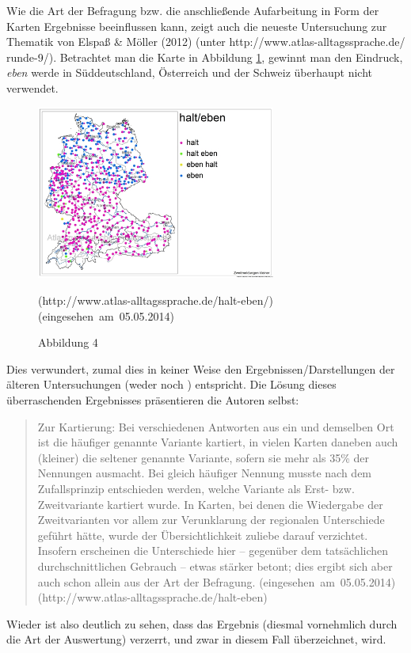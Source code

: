 Wie die Art der Befragung bzw. die anschließende Aufarbeitung in Form der Karten Ergebnisse beeinflussen kann, zeigt auch die neueste Untersuchung zur Thematik von Elspaß \& Möller (2012) (unter http://www.atlas-alltagssprache.de/\\runde-9/). Betrachtet man die Karte in Abbildung \ref{Abbildung 4}, gewinnt man den Eindruck, \textit{eben} werde in Süddeutschland, Österreich und der Schweiz überhaupt nicht verwendet.
\begin{figure}[h]
\includegraphics[width=0.7\textwidth]{he4.png}
\caption{Abbildung 4}
\label{Abbildung 4}
\hbox{}\hfill\hbox{(http://www.atlas-alltagssprache.de/halt-eben/)}
\hbox{}\hfill\hbox{(eingesehen am 05.05.2014)}
\end{figure}
\noindent																                       										
Dies verwundert, zumal dies in keiner Weise den Ergebnissen/Darstellungen der älteren Untersuchungen (weder \citealt{Eichhoff1978} noch \citealt{Elspass2005}) entspricht. Die Lösung dieses überraschenden Ergebnisses präsentieren die Autoren selbst:			
\begin{quotation}														                       										Zur Kartierung: Bei verschiedenen Antworten aus ein und demselben Ort ist die häufiger genannte Variante kartiert, in vielen Karten daneben auch (kleiner) die seltener genannte Variante, sofern sie mehr als 35\% der Nennungen ausmacht. Bei gleich häufiger Nennung musste nach dem Zufalls\-prinzip entschieden werden, welche Variante als Erst- bzw. Zweitvariante kartiert wurde. In Karten, bei denen die Wiedergabe der Zweitvarianten vor allem zur Verunklarung der regionalen Unterschiede geführt hätte, wurde der Übersichtlichkeit zuliebe darauf verzichtet. Insofern erscheinen die Unterschiede hier – gegenüber dem tatsächlichen \glqq durchschnittlichen\grqq{} Gebrauch – etwas stärker betont; dies ergibt sich aber auch schon allein aus der Art der Befragung.
\hfill\hbox{(eingesehen am 05.05.2014)}
\newline
\hbox{}\hfill\hbox{(http://www.atlas-alltagssprache.de/halt-eben)}
\end{quotation}
Wieder ist also deutlich zu sehen, dass das Ergebnis (diesmal vornehmlich durch die Art der Auswertung) verzerrt, und zwar in diesem Fall überzeichnet, wird.

